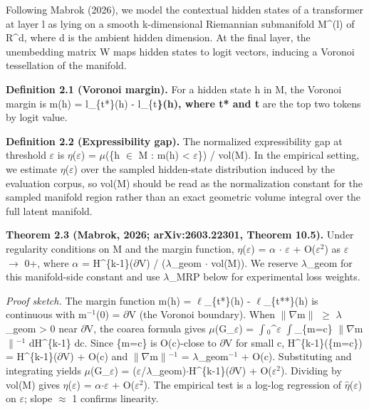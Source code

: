 \documentclass[
  11pt,
]{article}
\begin{document}
Following Mabrok (2026), we model the contextual hidden states of a
transformer at layer l as lying on a smooth k-dimensional Riemannian
submanifold M\^{}(l) of R\^{}d, where d is the ambient hidden dimension.
At the final layer, the unembedding matrix W maps hidden states to logit
vectors, inducing a Voronoi tessellation of the manifold.

\textbf{Definition 2.1 (Voronoi margin).} For a hidden state h in M, the
Voronoi margin is m(h) = l\_\{t*\}(h) - l\_\{t\textbf{\}(h), where t*
and t} are the top two tokens by logit value.

\textbf{Definition 2.2 (Expressibility gap).} The normalized
expressibility gap at threshold $\varepsilon$ is $\eta$($\varepsilon$) = $\mu$(\{h $\in$ M : m(h) \textless{}
$\varepsilon$\}) / vol(M). In the empirical setting, we estimate $\eta$($\varepsilon$) over the
sampled hidden-state distribution induced by the evaluation corpus, so
vol(M) should be read as the normalization constant for the sampled
manifold region rather than an exact geometric volume integral over the
full latent manifold.

\textbf{Theorem 2.3 (Mabrok, 2026; arXiv:2603.22301, Theorem 10.5).}
Under regularity conditions on M and the margin function, $\eta$($\varepsilon$) = $\alpha$ $\cdot$ $\varepsilon$ +
O($\varepsilon$$^2$) as $\varepsilon$ $\rightarrow$ 0+, where $\alpha$ = H\^{}\{k-1\}($\partial$V) / ($\lambda$\_geom $\cdot$ vol(M)). We
reserve $\lambda$\_geom for this manifold-side constant and use $\lambda$\_MRP below for
experimental loss weights.

\emph{Proof sketch.} The margin function m(h) = $\ell$\_\{t*\}(h) -
$\ell$\_\{t**\}(h) is continuous with m$^{-1}$(0) = $\partial$V (the Voronoi boundary).
When $\|$$\nabla$m$\|$ $\geq$ $\lambda$\_geom \textgreater{} 0 near $\partial$V, the coarea formula gives
$\mu$(G\_$\varepsilon$) = $\int$$_0$\^{}$\varepsilon$ $\int$\_\{m=c\} $\|$$\nabla$m$\|$$^{-1}$ dH\^{}\{k-1\} dc. Since \{m=c\} is
O(c)-close to $\partial$V for small c, H\^{}\{k-1\}(\{m=c\}) = H\^{}\{k-1\}($\partial$V) +
O(c) and $\|$$\nabla$m$\|$$^{-1}$ = $\lambda$\_geom$^{-1}$ + O(c). Substituting and integrating yields
$\mu$(G\_$\varepsilon$) = ($\varepsilon$/$\lambda$\_geom)$\cdot$H\^{}\{k-1\}($\partial$V) + O($\varepsilon$$^2$). Dividing by vol(M) gives
$\eta$($\varepsilon$) = $\alpha$$\cdot$$\varepsilon$ + O($\varepsilon$$^2$). The empirical test is a log-log regression of $\hat{\eta}$($\varepsilon$)
on $\varepsilon$; slope $\approx$ 1 confirms linearity.
\end{document}
